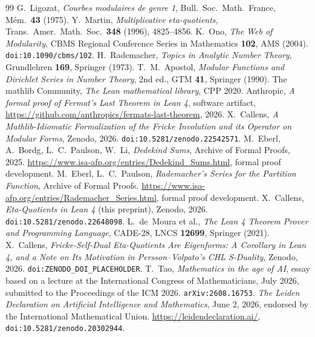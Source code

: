 \documentclass[11pt, a4paper]{article}
\theoremstyle{remark}
\begin{document}
\begin{thebibliography}{99}
 G.~Ligozat, \textit{Courbes modulaires de genre 1}, Bull.\ Soc.\ Math.\ France, M\'em.\ \textbf{43} (1975).
 Y.~Martin, \textit{Multiplicative eta-quotients}, Trans.\ Amer.\ Math.\ Soc.\ \textbf{348} (1996), 4825--4856.
 K.~Ono, \textit{The Web of Modularity}, CBMS Regional Conference Series in Mathematics \textbf{102}, AMS (2004). \texttt{doi:10.1090/cbms/102}.
 H.~Rademacher, \textit{Topics in Analytic Number Theory}, Grundlehren \textbf{169}, Springer (1973).
 T.~M.~Apostol, \textit{Modular Functions and Dirichlet Series in Number Theory}, 2nd ed., GTM \textbf{41}, Springer (1990).
 The mathlib Community, \textit{The Lean mathematical library}, CPP 2020.
 Anthropic, \textit{A formal proof of Fermat's Last Theorem in Lean 4}, software artifact, \url{https://github.com/anthropics/fermats-last-theorem}, 2026.
 X.~Callens, \textit{A Mathlib-Idiomatic Formalization of the Fricke Involution and its Operator on Modular Forms}, Zenodo, 2026. \texttt{doi:10.5281/zenodo.22542571}.
 M.~Eberl, A.~Bordg, L.~C.~Paulson, W.~Li, \textit{Dedekind Sums}, Archive of Formal Proofs, 2025. \url{https://www.isa-afp.org/entries/Dedekind_Sums.html}, formal proof development.
 M.~Eberl, L.~C.~Paulson, \textit{Rademacher's Series for the Partition Function}, Archive of Formal Proofs. \url{https://www.isa-afp.org/entries/Rademacher_Series.html}, formal proof development.
 X.~Callens, \textit{Eta-Quotients in Lean 4} (this preprint), Zenodo, 2026. \texttt{doi:10.5281/zenodo.22648098}.
 L.~de~Moura et al., \textit{The Lean 4 Theorem Prover and Programming Language}, CADE-28, LNCS \textbf{12699}, Springer (2021).
 X.~Callens, \textit{Fricke-Self-Dual Eta-Quotients Are Eigenforms: A
Corollary in Lean 4, and a Note on Its Motivation in Persson--Volpato's CHL S-Duality}, Zenodo,
2026. \texttt{doi:ZENODO\_DOI\_PLACEHOLDER}.
 T.~Tao, \textit{Mathematics in the age of AI}, essay based on a lecture at the
International Congress of Mathematicians, July 2026, submitted to the Proceedings of the ICM 2026.
\texttt{arXiv:2608.16753}.
 \textit{The Leiden Declaration on Artificial Intelligence and Mathematics},
June 2, 2026, endorsed by the International Mathematical Union. \url{https://leidendeclaration.ai/},
\texttt{doi:10.5281/zenodo.20302944}.
\end{thebibliography}
\end{document}

